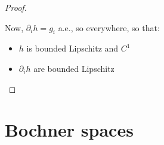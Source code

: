 \documentclass[english,a4paper,9pt,oneside]{scrbook}	%
\theoremstyle{break}
\newenvironment{mproof}[1][\proofname]{%
  \begin{proof}[#1]$ $\par\nobreak\ignorespaces
}{%
  \end{proof}
}
\renewcommand*{\proofname}{Proof}
\theoremstyle{remark}
\newcommand{\ds}{\displaystyle}
\newcommand{\cc}{\subset\subset}
\begin{document}
\begin{appendices}
\begin{mproof}
Now, $\partial_i h =g_i$ a.e., so everywhere, so that:

\begin{itemize}
\item $h$ is bounded Lipschitz and $C^1$
\item $\partial_i h$ are bounded Lipschitz
\end{itemize}

%
%
%
%
%

\end{mproof}

\section{Bochner spaces}


\end{appendices}
\end{document}
